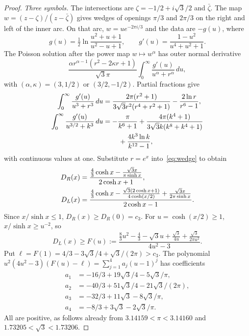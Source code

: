 \documentclass[12pt,letterpaper,onecolumn]{article}
\begin{document}
\begin{proof}
\emph{Three symbols.}
The intersections are $\zeta=-1/2+i\sqrt3/2$ and $\bar\zeta$. The map $w=(z-\zeta)/(z-\bar\zeta)$ gives wedges of openings $\pi/3$ and $2\pi/3$ on the right and left of the inner arc. On that arc, $w=u e^{-2\pi i/3}$ and the data are $-g(u)$, where
\[
g(u)=\tfrac12\ln\frac{u^2+u+1}{u^2-u+1},\qquad
g'(u)=\frac{1-u^2}{u^4+u^2+1}.
\]
The Poisson solution after the power map $w\mapsto w^\alpha$ has outer normal derivative
\begin{equation}\label{eq:wedge}
\frac{\alpha r^{\alpha-1}(r^2-2\kappa r+1)}{\sqrt3\pi}
\int_0^\infty\frac{g'(u)}{u^\alpha+r^\alpha}\,du,
\end{equation}
with $(\alpha,\kappa)=(3,1/2)$ or $(3/2,-1/2)$. Partial fractions give
\begin{align}
\int_0^\infty\frac{g'(u)}{u^3+r^3}\,du
&=\frac{2\pi(r^2+1)}{3\sqrt3r^2(r^4+r^2+1)}
-\frac{2\ln r}{r^6-1},\notag\\
\int_0^\infty\frac{g'(u)}{u^{3/2}+k^3}\,du
&=-\frac\pi{k^6+1}
+\frac{4\pi(k^4+1)}{3\sqrt3k(k^8+k^4+1)}\notag\\
&\hspace{8mm}+\frac{4k^3\ln k}{k^{12}-1},\label{eq:wedgeintegrals}
\end{align}
with continuous values at one. Substitute $r=e^x$ into~\eqref{eq:wedge} to obtain
\begin{align}
D_R(x)&=\frac{\frac43\cosh x-\frac{\sqrt3x}{\pi\sinh x}}
{2\cosh x+1},\notag\\
D_L(x)&=\frac{\frac43\cosh x-\frac{\sqrt3(2\cosh x+1)}{4\cosh(x/2)}
+\frac{\sqrt3x}{2\pi\sinh x}}{2\cosh x-1}.\label{eq:ternaryD}
\end{align}
Since $x/\sinh x\le1$, $D_R(x)\ge D_R(0)=c_3$. For $u=\cosh(x/2)\ge1$, $x/\sinh x\ge u^{-2}$, so
\[
D_L(x)\ge F(u):=
\frac{\frac83u^2-\frac43-\sqrt3u+\frac{\sqrt3}{4u}
+\frac{\sqrt3}{2\pi u^2}}{4u^2-3}.
\]
Put $\ell=F(1)=4/3-3\sqrt3/4+\sqrt3/(2\pi)>c_3$.
The polynomial $u^2(4u^2-3)(F(u)-\ell)=\sum_{j=1}^4a_j(u-1)^j$ has coefficients
\begin{align*}
a_1&=-16/3+19\sqrt3/4-5\sqrt3/\pi,\\
a_2&=-40/3+51\sqrt3/4-21\sqrt3/(2\pi),\\
a_3&=-32/3+11\sqrt3-8\sqrt3/\pi,\\
a_4&=-8/3+3\sqrt3-2\sqrt3/\pi.
\end{align*}
All are positive, as follows already from
$3.14159<\pi<3.14160$ and $1.73205<\sqrt3<1.73206$.


\end{proof}
\end{document}
